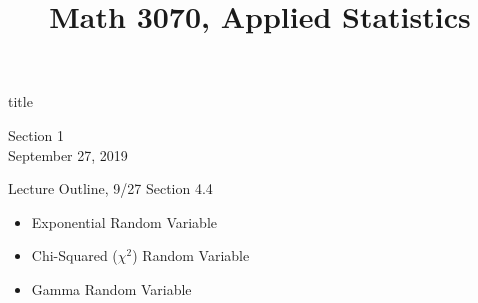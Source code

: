 \documentclass[handout]{beamer}
\title{Math 3070, Applied Statistics}
\newcommand{\nl}[1]{\vspace{#1 em}}
\begin{document}
\begin{frame}
    \begin{beamercolorbox}[rounded=true,wd=\textwidth,center]{title}
        \inserttitle
    \end{beamercolorbox}
    \begin{center}
        Section 1\\
        \nl{0.5}
        September 27, 2019
    \end{center}
\end{frame}
\begin{frame}{Lecture Outline, 9/27}
    Section 4.4
    \begin{itemize}
        \item Exponential Random Variable
        \item Chi-Squared ($\chi^2$) Random Variable
        \item Gamma Random Variable
    \end{itemize}
\end{frame}
\end{document}
